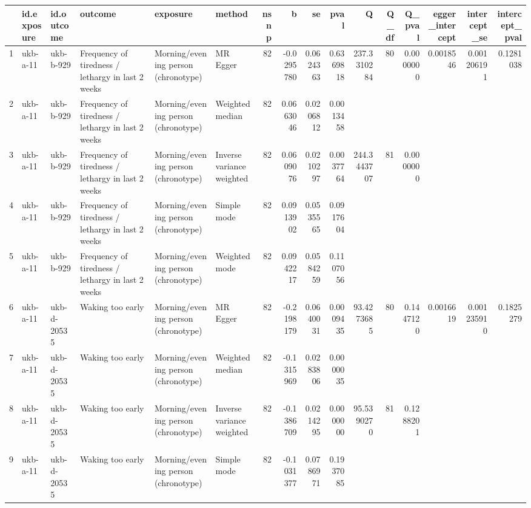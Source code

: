 \begin{table}[ht]
\centering
\begin{tabular}{llllllrrrrrrrrrr}
  \hline
 & id.exposure & id.outcome & outcome & exposure & method & nsnp & b & se & pval & Q & Q\_df & Q\_pval & egger\_intercept & intercept\_se & intercept\_pval \\ 
  \hline
1 & ukb-a-11 & ukb-b-929 & Frequency of tiredness / lethargy in last 2 weeks & Morning/evening person (chronotype) & MR Egger & 82 & -0.0295780 & 0.0624363 & 0.6369818 & 237.3310284 & 80 & 0.0000000 & 0.0018546 & 0.001206191 & 0.1281038 \\ 
  2 & ukb-a-11 & ukb-b-929 & Frequency of tiredness / lethargy in last 2 weeks & Morning/evening person (chronotype) & Weighted median & 82 & 0.0663046 & 0.0206812 & 0.0013458 &  &  &  &  &  &  \\ 
  3 & ukb-a-11 & ukb-b-929 & Frequency of tiredness / lethargy in last 2 weeks & Morning/evening person (chronotype) & Inverse variance weighted & 82 & 0.0609076 & 0.0210297 & 0.0037764 & 244.3443707 & 81 & 0.0000000 &  &  &  \\ 
  4 & ukb-a-11 & ukb-b-929 & Frequency of tiredness / lethargy in last 2 weeks & Morning/evening person (chronotype) & Simple mode & 82 & 0.0913902 & 0.0535565 & 0.0917604 &  &  &  &  &  &  \\ 
  5 & ukb-a-11 & ukb-b-929 & Frequency of tiredness / lethargy in last 2 weeks & Morning/evening person (chronotype) & Weighted mode & 82 & 0.0942217 & 0.0584259 & 0.1107056 &  &  &  &  &  &  \\ 
  6 & ukb-a-11 & ukb-d-20535 & Waking too early & Morning/evening person (chronotype) & MR Egger & 82 & -0.2198179 & 0.0640031 & 0.0009435 & 93.4273685 & 80 & 0.1447120 & 0.0016619 & 0.001235910 & 0.1825279 \\ 
  7 & ukb-a-11 & ukb-d-20535 & Waking too early & Morning/evening person (chronotype) & Weighted median & 82 & -0.1315969 & 0.0283806 & 0.0000035 &  &  &  &  &  &  \\ 
  8 & ukb-a-11 & ukb-d-20535 & Waking too early & Morning/evening person (chronotype) & Inverse variance weighted & 82 & -0.1386709 & 0.0214295 & 0.0000000 & 95.5390270 & 81 & 0.1288201 &  &  &  \\ 
  9 & ukb-a-11 & ukb-d-20535 & Waking too early & Morning/evening person (chronotype) & Simple mode & 82 & -0.1031377 & 0.0786971 & 0.1937085 &  &  &  &  &  &  \\ 

\end{tabular}
\end{table}

